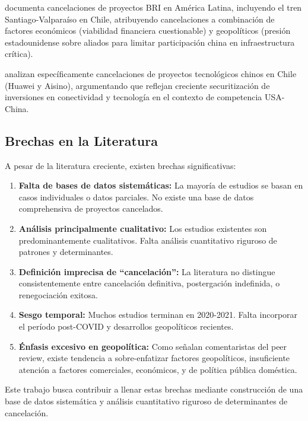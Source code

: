 \documentclass[12pt]{article}
\begin{document}
\citet{myers2021belt} documenta cancelaciones de proyectos BRI en América Latina, incluyendo el tren Santiago-Valparaíso en Chile, atribuyendo cancelaciones a combinación de factores económicos (viabilidad financiera cuestionable) y geopolíticos (presión estadounidense sobre aliados para limitar participación china en infraestructura crítica).

\citet{gonzalez2021china} analizan específicamente cancelaciones de proyectos tecnológicos chinos en Chile (Huawei y Aisino), argumentando que reflejan creciente securitización de inversiones en conectividad y tecnología en el contexto de competencia USA-China.

\subsection{Brechas en la Literatura}

A pesar de la literatura creciente, existen brechas significativas:

\begin{enumerate}
    \item \textbf{Falta de bases de datos sistemáticas:} La mayoría de estudios se basan en casos individuales o datos parciales. No existe una base de datos comprehensiva de proyectos cancelados.
    
    \item \textbf{Análisis principalmente cualitativo:} Los estudios existentes son predominantemente cualitativos. Falta análisis cuantitativo riguroso de patrones y determinantes.
    
    \item \textbf{Definición imprecisa de ``cancelación'':} La literatura no distingue consistentemente entre cancelación definitiva, postergación indefinida, o renegociación exitosa.
    
    \item \textbf{Sesgo temporal:} Muchos estudios terminan en 2020-2021. Falta incorporar el período post-COVID y desarrollos geopolíticos recientes.
    
    \item \textbf{Énfasis excesivo en geopolítica:} Como señalan comentaristas del peer review, existe tendencia a sobre-enfatizar factores geopolíticos, insuficiente atención a factores comerciales, económicos, y de política pública doméstica.
\end{enumerate}

Este trabajo busca contribuir a llenar estas brechas mediante construcción de una base de datos sistemática y análisis cuantitativo riguroso de determinantes de cancelación.
\end{document}
